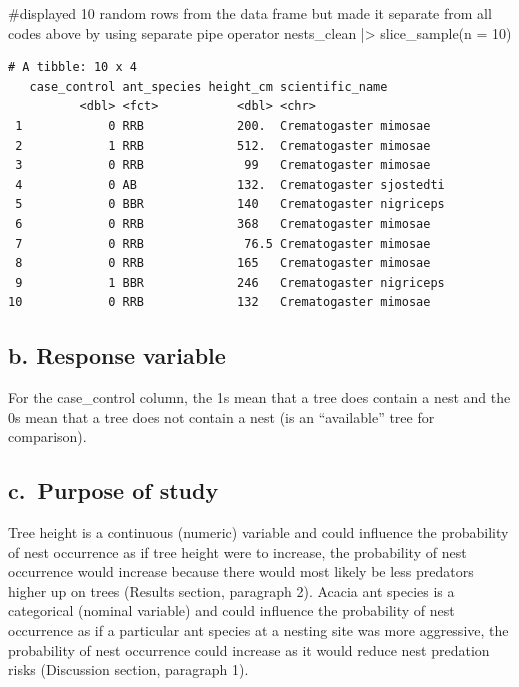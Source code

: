 \documentclass[
  letterpaper,
  DIV=11,
  numbers=noendperiod]{scrartcl}
\newenvironment{Shaded}{\begin{snugshade}}{\end{snugshade}}
\newcommand{\AttributeTok}[1]{\textcolor[rgb]{0.40,0.45,0.13}{#1}}
\newcommand{\CommentTok}[1]{\textcolor[rgb]{0.37,0.37,0.37}{#1}}
\newcommand{\DecValTok}[1]{\textcolor[rgb]{0.68,0.00,0.00}{#1}}
\newcommand{\FunctionTok}[1]{\textcolor[rgb]{0.28,0.35,0.67}{#1}}
\newcommand{\NormalTok}[1]{\textcolor[rgb]{0.00,0.23,0.31}{#1}}
\newcommand{\SpecialCharTok}[1]{\textcolor[rgb]{0.37,0.37,0.37}{#1}}
\begin{document}
\begin{Shaded}
\begin{Highlighting}[]
\CommentTok{\#displayed 10 random rows from the data frame but made it separate from all codes above by using separate pipe operator }
\NormalTok{nests\_clean }\SpecialCharTok{|\textgreater{}}  \FunctionTok{slice\_sample}\NormalTok{(}\AttributeTok{n =} \DecValTok{10}\NormalTok{)}
\end{Highlighting}
\end{Shaded}

\begin{verbatim}
# A tibble: 10 x 4
   case_control ant_species height_cm scientific_name        
          <dbl> <fct>           <dbl> <chr>                  
 1            0 RRB             200.  Crematogaster mimosae  
 2            1 RRB             512.  Crematogaster mimosae  
 3            0 RRB              99   Crematogaster mimosae  
 4            0 AB              132.  Crematogaster sjostedti
 5            0 BBR             140   Crematogaster nigriceps
 6            0 RRB             368   Crematogaster mimosae  
 7            0 RRB              76.5 Crematogaster mimosae  
 8            0 RRB             165   Crematogaster mimosae  
 9            1 BBR             246   Crematogaster nigriceps
10            0 RRB             132   Crematogaster mimosae  
\end{verbatim}

\subsection{b. Response variable}\label{b.-response-variable}

For the case\_control column, the 1s mean that a tree does contain a
nest and the 0s mean that a tree does not contain a nest (is an
``available'' tree for comparison).

\subsection{c.~Purpose of study}\label{c.-purpose-of-study}

Tree height is a continuous (numeric) variable and could influence the
probability of nest occurrence as if tree height were to increase, the
probability of nest occurrence would increase because there would most
likely be less predators higher up on trees (Results section, paragraph
2). Acacia ant species is a categorical (nominal variable) and could
influence the probability of nest occurrence as if a particular ant
species at a nesting site was more aggressive, the probability of nest
occurrence could increase as it would reduce nest predation risks
(Discussion section, paragraph 1).
\end{document}
